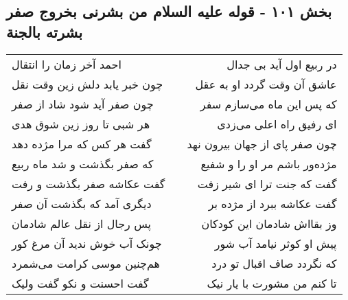 \begin{center}
\section*{بخش ۱۰۱ - قوله علیه السلام من بشرنی بخروج صفر بشرته بالجنة}
\label{sec:sh101}
\begin{longtable}{l p{0.5cm} r}
احمد آخر زمان را انتقال
&&
در ربیع اول آید بی جدال
\\
چون خبر یابد دلش زین وقت نقل
&&
عاشق آن وقت گردد او به عقل
\\
چون صفر آید شود شاد از صفر
&&
که پس این ماه می‌سازم سفر
\\
هر شبی تا روز زین شوق هدی
&&
ای رفیق راه اعلی می‌زدی
\\
گفت هر کس که مرا مژده دهد
&&
چون صفر پای از جهان بیرون نهد
\\
که صفر بگذشت و شد ماه ربیع
&&
مژده‌ور باشم مر او را و شفیع
\\
گفت عکاشه صفر بگذشت و رفت
&&
گفت که جنت ترا ای شیر زفت
\\
دیگری آمد که بگذشت آن صفر
&&
گفت عکاشه ببرد از مژده بر
\\
پس رجال از نقل عالم شادمان
&&
وز بقااش شادمان این کودکان
\\
چونک آب خوش ندید آن مرغ کور
&&
پیش او کوثر نیامد آب شور
\\
هم‌چنین موسی کرامت می‌شمرد
&&
که نگردد صاف اقبال تو درد
\\
گفت احسنت و نکو گفت ولیک
&&
تا کنم من مشورت با یار نیک
\\
\end{longtable}
\end{center}
